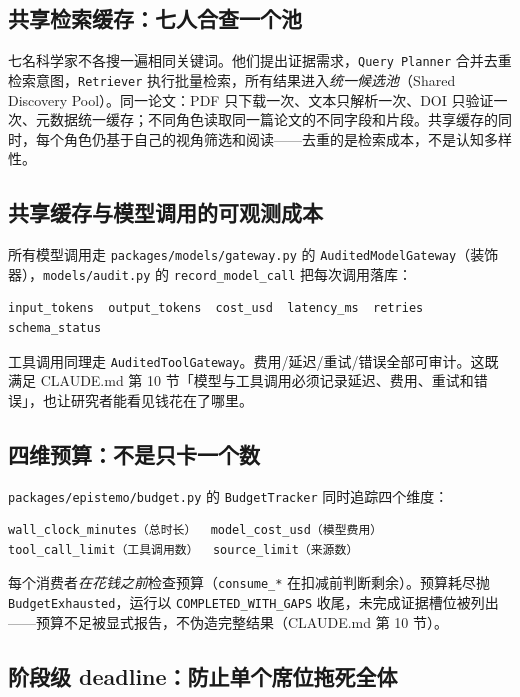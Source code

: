 \subsection{共享检索缓存：七人合查一个池}

七名科学家不各搜一遍相同关键词。他们提出证据需求，\texttt{Query Planner} 合并去重检索意图，\texttt{Retriever} 执行批量检索，所有结果进入\emph{统一候选池}（Shared Discovery Pool）。同一论文：PDF 只下载一次、文本只解析一次、DOI 只验证一次、元数据统一缓存；不同角色读取同一篇论文的不同字段和片段。共享缓存的同时，每个角色仍基于自己的视角筛选和阅读——去重的是检索成本，不是认知多样性。

\subsection{共享缓存与模型调用的可观测成本}

所有模型调用走 \texttt{packages/models/gateway.py} 的 \texttt{AuditedModelGateway}（装饰器），\texttt{models/audit.py} 的 \texttt{record\_model\_call} 把每次调用落库：

\begin{verbatim}
input_tokens  output_tokens  cost_usd  latency_ms  retries  schema_status
\end{verbatim}

工具调用同理走 \texttt{AuditedToolGateway}。费用/延迟/重试/错误全部可审计。这既满足 CLAUDE.md 第 10 节「模型与工具调用必须记录延迟、费用、重试和错误」，也让研究者能看见钱花在了哪里。

\subsection{四维预算：不是只卡一个数}

\texttt{packages/epistemo/budget.py} 的 \texttt{BudgetTracker} 同时追踪四个维度：

\begin{lstlisting}
wall_clock_minutes（总时长）  model_cost_usd（模型费用）
tool_call_limit（工具调用数）  source_limit（来源数）
\end{lstlisting}

每个消费者\emph{在花钱之前}检查预算（\texttt{consume\_*} 在扣减前判断剩余）。预算耗尽抛 \texttt{BudgetExhausted}，运行以 \texttt{COMPLETED\_WITH\_GAPS} 收尾，未完成证据槽位被列出——预算不足被显式报告，不伪造完整结果（CLAUDE.md 第 10 节）。

\subsection{阶段级 deadline：防止单个席位拖死全体}


